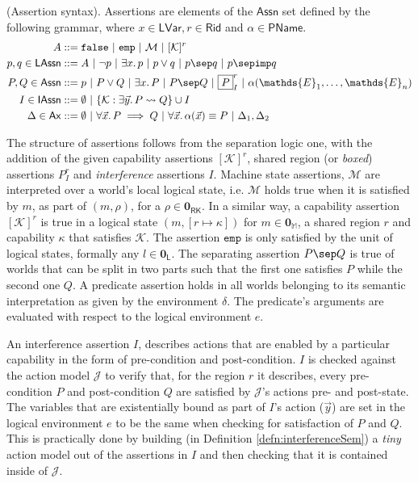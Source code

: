 \begin{defn}
	(Assertion syntax).
	Assertions are elements of the $\mathsf{Assn}$ set defined by the following grammar, where $x \in \mathsf{LVar}, r \in \mathsf{Rid}$ and $\alpha \in \mathsf{PName}$. 
	\begin{align*}
		A &::= \mathtt{false}\ |\ \mathtt{emp}\ |\ \mathcal{M}\ |\ [\mathcal{K}]^r \\
		p, q \in \mathsf{LAssn} &::= A\ |\ \lnot p\ |\ \exists x \ldotp p\ |\ p \lor q\ |\ p \sep q\ |\ p \sepimp q \\
		P, Q \in \mathsf{Assn} &::= p\ |\ P \lor Q\ |\ \exists x \ldotp P\ |\ P \sep Q\ |\ \boxed{P}_I^r\ |\ \alpha(\mathds{E}_1, \ldots, \mathds{E}_n) \\
		I \in \mathsf{IAssn} &::= \emptyset\ |\ \{ \mathcal{K} : \exists \vec{y} \ldotp P \leadsto Q \} \cup I \\
		\Delta \in \mathsf{Ax} &::= \emptyset\ |\ \forall \vec{x} \ldotp P \implies Q\ |\ \forall \vec{x} \ldotp \alpha(\vec{x}) \equiv P\ |\ \Delta_1, \Delta_2
	\end{align*}
\end{defn}

The structure of assertions follows from the separation logic one, with the addition of the given capability assertions $[\mathcal{K}]^r$, shared region (or \textit{boxed}) assertions $\boxed{P}^r_I$ and \textit{interference} assertions $I$. Machine state assertions, $\mathcal{M}$ are interpreted over a world's local logical state, i.e. $\mathcal{M}$ holds true when it is satisfied by $m$, as part of $(m, \rho)$, for a $\rho \in \mathbf{0}_\mathsf{RK}$. In a similar way, a capability assertion $[\mathcal{K}]^r$ is true in a logical state $(m, [r \mapsto \kappa])$ for $m \in\mathbf{0}_\mathbb{M}$, a shared region $r$ and capability $\kappa$ that satisfies $\mathcal{K}$. The assertion $\mathtt{emp}$ is only satisfied by the unit of logical states, formally any $l \in \mathbf{0}_\mathsf{L}$. The separating assertion $P \sep Q$ is true of worlds that can be split in two parts such that the first one satisfies $P$ while the second one $Q$. A predicate assertion holds in all worlds belonging to its semantic interpretation as given by the environment $\delta$. The predicate's arguments are evaluated with respect to the logical environment $e$.

An interference assertion $I$, describes actions that are enabled by a particular capability in the form of pre-condition and post-condition. $I$ is checked against the action model $\mathcal{J}$ to verify that, for the region $r$ it describes, every pre-condition $P$ and post-condition $Q$ are satisfied by $\mathcal{J}$'s actions pre- and post-state. The variables that are existentially bound as part of $I$'s action ($\vec{y}$) are set in the logical environment $e$ to be the same when checking for satisfaction of $P$ and $Q$. This is practically done by building (in Definition \ref{defn:interferenceSem}) a \textit{tiny} action model out of the assertions in $I$ and then checking that it is contained inside of $\mathcal{J}$.

